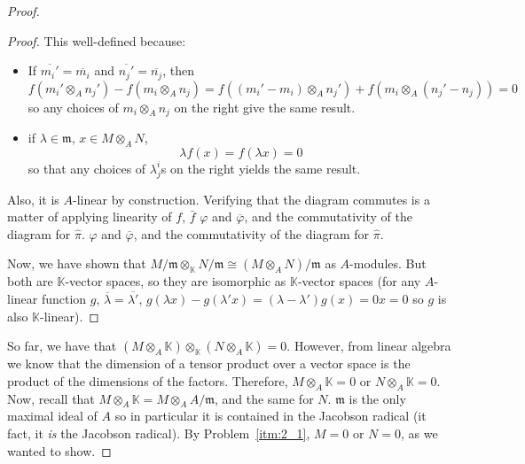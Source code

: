 \begin{problem}
\begin{enumerate}[label=(\theproblem.\arabic*),ref=\theproblem.\arabic*]
\begin{sol}
\begin{proof}
\begin{claim}
\begin{proof}
                                This well-defined because:
                                \begin{itemize}
                                    \item If $\overline{m_i'} = \overline{m_i}$ and $\overline{n_j'} = \overline{n_j}$, then
                                    \[f(m_i' \otimes_A n_j') - f(m_i \otimes_A n_j) = f((m_i' - m_i) \otimes_A n_j') + f(m_i \otimes_A (n_j' - n_j)) = 0\]
                                    so any choices of $m_i \otimes_A n_j$ on the right give the same result.
                                    \item if ${\lambda \in \mathfrak{m}}$, ${x \in M \otimes_A N}$,
                                    \[\lambda f(x) = f(\lambda x) = 0\]
                                    so that any choices of $\lambda^i_j$s on the right yields the same result.
                                \end{itemize}




                                Also, it is $A$-linear by construction.
                                Verifying that the diagram commutes is a matter of applying linearity of $f$, $\bar{f}$
                                $\varphi$ and $\overline{\varphi}$, and the commutativity of the diagram for $\hat{\pi}$.
                                $\varphi$ and $\overline{\varphi}$, and the commutativity of the diagram for $\hat{\pi}$.

                                Now, we have shown that $M/\mathfrak{m} \otimes_\mathbb{K} N/\mathfrak{m} \cong (M \otimes_A N)/\mathfrak{m}$ as $A$-modules.
                                But both are $\mathbb{K}$-vector spaces, so they are isomorphic as $\mathbb{K}$-vector spaces (for any $A$-linear function $g$,
                                $\overline{\lambda} = \overline{\lambda'}$,
                                $g(\lambda x) - g(\lambda'x) = (\lambda - \lambda') g(x) = 0x = 0$ so $g$ is also $\mathbb{K}$-linear).
                            \end{proof}
                    \end{claim}

                    So far, we have that $ (M \otimes_A \mathbb{K}) \otimes_\mathbb{K}( N \otimes_A \mathbb{K}) = 0$.
                    However, from linear algebra we know that the dimension of a tensor product over a vector space
                    is the product of the dimensions of the factors.
                    Therefore, $M \otimes_A \mathbb{K} = 0$ or $N \otimes_A \mathbb{K} = 0$.
                    Now, recall that $M \otimes_A \mathbb{K} = M \otimes_A A/\mathfrak{m} $, and the same for $N$.
                    $\mathfrak{m}$ is the only maximal ideal of $A$ so in particular it is contained in the Jacobson radical (it fact, it \emph{is} the Jacobson radical).
                    By Problem~\ref{itm:2_1}, $M = 0$ or $N = 0$, as we wanted to show.




\end{proof}
\end{sol}
\end{enumerate}
\end{problem}

